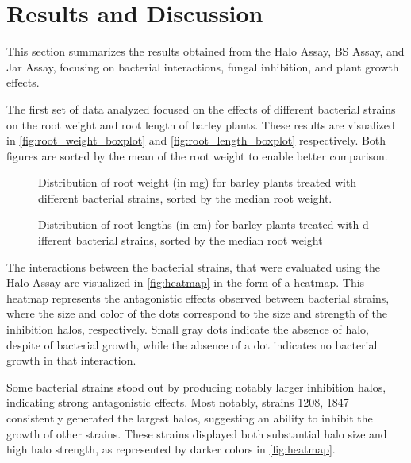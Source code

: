 \newpage
\section{Results and Discussion}

This section summarizes the results obtained from the Halo Assay, BS Assay, and Jar Assay, focusing on bacterial interactions, fungal inhibition, and plant growth effects.

\par
The first set of data analyzed focused on the effects of different bacterial strains on the root weight and root length of barley plants. These results are visualized in \autoref{fig:root_weight_boxplot} and \autoref{fig:root_length_boxplot} respectively.
Both figures are sorted by the mean of the root weight to enable better comparison. 


\begin{figure}[H]
    \makebox[\textwidth]{ %
    
    }
    \caption{Distribution of root weight (in mg) for barley plants treated with different bacterial strains, sorted by the median root weight.}
    \label{fig:root_weight_boxplot}
\end{figure}%

\begin{figure}[htbp]
    \centering
    \setlength{\abovecaptionskip}{-30pt} %
    
    \caption{Distribution of root lengths (in cm) for barley plants treated with d ifferent bacterial strains, sorted by the median root weight}
    \label{fig:root_length_boxplot}
\end{figure}


The interactions between the bacterial strains, that were evaluated using the Halo Assay are visualized in \autoref{fig:heatmap} in the form of a heatmap. 
This heatmap represents the antagonistic effects observed between bacterial strains, where the size and color of the dots correspond to the size and strength of the inhibition halos, respectively. Small gray dots indicate the absence of halo, despite of bacterial growth, while the absence of a dot indicates no bacterial growth in that interaction. 

Some bacterial strains stood out by producing notably larger inhibition halos, indicating strong antagonistic effects. Most notably, strains 1208, 1847 consistently generated the largest halos, suggesting an ability to inhibit the growth of other strains. These strains displayed both substantial halo size and high halo strength, as represented by darker colors in \autoref{fig:heatmap}.

